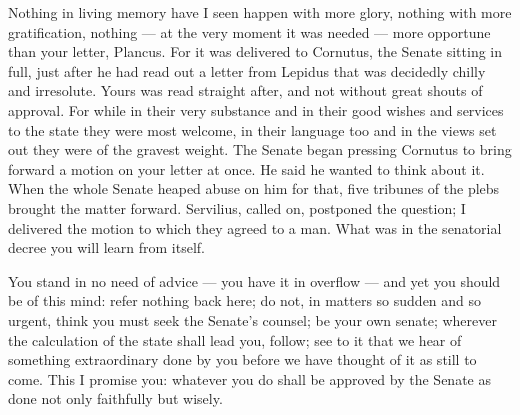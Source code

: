 

 Nothing in living memory have I seen happen with more glory, nothing with more gratification, nothing --- at the very moment it was needed --- more opportune than your letter, Plancus. For it was delivered to Cornutus, the Senate sitting in full, just after he had read out a letter from Lepidus that was decidedly chilly and irresolute. Yours was read straight after, and not without great shouts of approval. For while in their very substance and in their good wishes and services to the state they were most welcome, in their language too and in the views set out they were of the gravest weight. The Senate began pressing Cornutus to bring forward a motion on your letter at once. He said he wanted to think about it. When the whole Senate heaped abuse on him for that, five tribunes of the plebs brought the matter forward. Servilius, called on, postponed the question; I delivered the motion to which they agreed to a man. What was in the senatorial decree you will learn from itself.

 You stand in no need of advice --- you have it in overflow --- and yet you should be of this mind: refer nothing back here; do not, in matters so sudden and so urgent, think you must seek the Senate's counsel; be your own senate; wherever the calculation of the state shall lead you, follow; see to it that we hear of something extraordinary done by you before we have thought of it as still to come. This I promise you: whatever you do shall be approved by the Senate as done not only faithfully but wisely.
